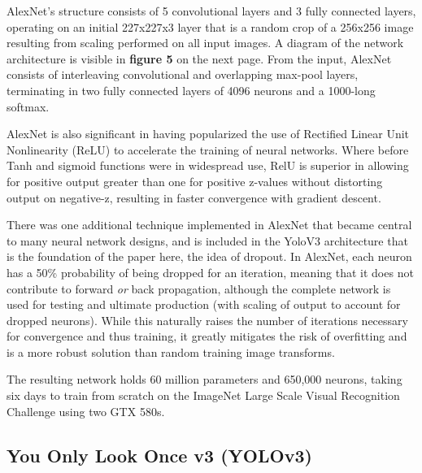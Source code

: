 \documentclass[sigconf]{acmart}
\begin{document}
AlexNet's structure consists of 5 convolutional layers and 3 fully connected layers, operating on an initial 227x227x3 layer that is a random crop of a 256x256 image resulting from scaling performed on all input images.\cite{AlexNet} A diagram of the network architecture is visible in \textbf{figure 5} on the next page. From the input, AlexNet consists of interleaving convolutional and overlapping max-pool layers, terminating in two fully connected layers of 4096 neurons and a 1000-long softmax. \cite{UnderAlexNet}

AlexNet is also significant in having popularized the use of Rectified Linear Unit Nonlinearity (ReLU) to accelerate the training of neural networks. Where before Tanh and sigmoid functions were in widespread use, RelU is superior in allowing for positive output greater than one for positive z-values without distorting output on negative-z, resulting in faster convergence with gradient descent. \cite{UnderAlexNet}

There was one additional technique implemented in AlexNet that became central to many neural network designs, and is included in the YoloV3 architecture that is the foundation of the paper here, the idea of dropout. In AlexNet, each neuron has a 50\% probability of being dropped for an iteration, meaning that it does not contribute to forward \textit{or} back propagation, although the complete network is used for testing and ultimate production (with scaling of output to account for dropped neurons). While this naturally raises the number of iterations necessary for convergence and thus training, it greatly mitigates the risk of overfitting and is a more robust solution than random training image transforms. \cite{UnderAlexNet}

The resulting network holds 60 million parameters and 650,000 neurons, taking six days to train from scratch on the ImageNet Large Scale Visual Recognition Challenge using two GTX 580s.\cite{UnderAlexNet}

\subsection{You Only Look Once v3 (YOLOv3)}
\end{document}
